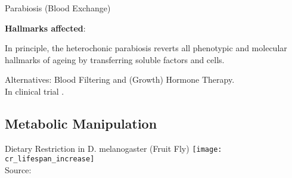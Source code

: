 \begin{frame}[c]{Parabiosis (Blood Exchange)}
    \large



    \textbf{Hallmarks affected}:
    \begin{aquote}{\cite{conese2017fountain}}
        In principle, the heterochonic parabiosis reverts all phenotypic and molecular hallmarks of ageing by transferring soluble factors and cells.
    \end{aquote}

    \pause
    Alternatives: Blood Filtering and (Growth) Hormone Therapy. \\
    \pause
    In clinical trial \cite{AStudyto73:online}.
\end{frame}


\subsection{Metabolic Manipulation}

\begin{frame}[c]{Dietary Restriction in D. melanogaster (Fruit Fly)}
    \texttt{[image: cr\_lifespan\_increase]} \\
    Source: \cite{mair2005calories}
\end{frame}

